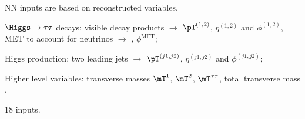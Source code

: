 \begin{frame}%

\manip NN inputs are based on reconstructed variables.

\pause
\manip $\Higgs\to\tau\tau$ decays:
\submanip visible decay products $\to$ $\pT^{(1,2)}$, $\eta^{(1,2)}$ and $\phi^{(1,2)}$,
\submanip MET to account for neutrinos $\to$ \MET, $\phi^\text{MET}$;

\pause
\manip Higgs production:
\submanip two leading jets $\to$ $\pT^{(j1,j2)}$, $\eta^{(j1,j2)}$ and $\phi^{(j1,j2)}$;

\pause
\manip Higher level variables:
\submanip transverse masses $\mT^1$, $\mT^2$, $\mT^{\tau\tau}$,
\submanip total transverse mass \mTtot.

\vfill

\pause
\manip \num{18} inputs.

\end{frame}
